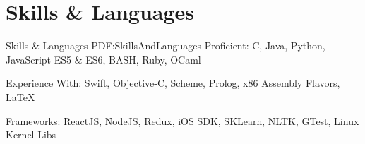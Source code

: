\section
{Skills \&\newline
Languages}
{Skills \& Languages}
{PDF:SkillsAndLanguages}
\BulletItem
Proficient: C, Java, Python, JavaScript ES5 \& ES6, BASH, Ruby, OCaml

\GapNoBreak
\BulletItem
Experience With: Swift, Objective-C, Scheme, Prolog, x86 Assembly Flavors, {\LaTeX}

\GapNoBreak
\BulletItem
Frameworks: ReactJS, NodeJS, Redux, iOS SDK, SKLearn, NLTK, GTest, Linux Kernel Libs
